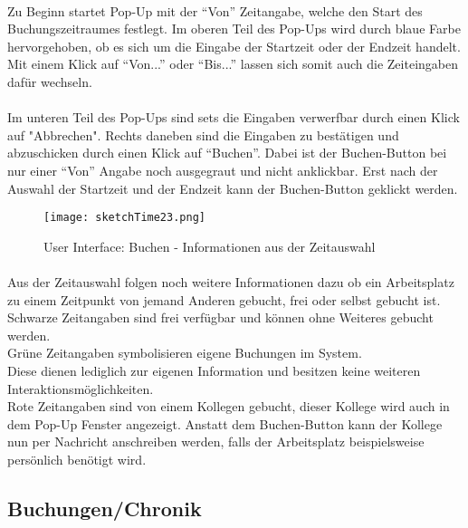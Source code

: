 \paragraph{} Zu Beginn startet Pop-Up mit der "`Von"' Zeitangabe, welche den Start des Buchungszeitraumes festlegt. 
Im oberen Teil des Pop-Ups wird durch blaue Farbe hervorgehoben, ob es sich um die Eingabe der Startzeit oder der Endzeit handelt.
Mit einem Klick auf "`Von..."' oder "`Bis..."' lassen sich somit auch die Zeiteingaben dafür wechseln. 

\paragraph{}Im unteren Teil des Pop-Ups sind sets die Eingaben verwerfbar durch einen Klick auf "Abbrechen".
Rechts daneben sind die Eingaben zu bestätigen und abzuschicken durch einen Klick auf "`Buchen"'.
Dabei ist der Buchen-Button bei nur einer "`Von"' Angabe noch ausgegraut und nicht anklickbar.
Erst nach der Auswahl der Startzeit und der Endzeit kann der Buchen-Button geklickt werden.

\begin{figure}[!h]
  \centering
  \texttt{[image: sketchTime23.png]}
  \caption{User Interface: Buchen - Informationen aus der Zeitauswahl}
  \label{fig:sketch_time_23}
\end{figure}

\paragraph{}Aus der Zeitauswahl folgen noch weitere Informationen dazu ob ein Arbeitsplatz zu einem Zeitpunkt von jemand Anderen gebucht, frei oder selbst gebucht ist. \\
Schwarze Zeitangaben sind frei verfügbar und können ohne Weiteres gebucht werden. \\
Grüne Zeitangaben symbolisieren eigene Buchungen im System. \\
Diese dienen lediglich zur eigenen Information und besitzen keine weiteren Interaktionsmöglichkeiten.\\
Rote Zeitangaben sind von einem Kollegen gebucht, dieser Kollege wird auch in dem Pop-Up Fenster angezeigt.
Anstatt dem Buchen-Button kann der Kollege nun per Nachricht anschreiben werden, falls der Arbeitsplatz beispielsweise persönlich benötigt wird. 

\subsection{Buchungen/Chronik}

